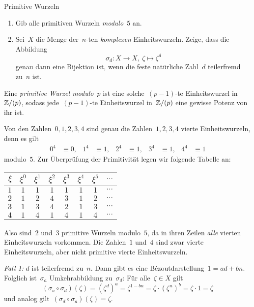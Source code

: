 \documentclass{algblatt}
\begin{document}
\ifloesungen\newpage\fi
\begin{aufgabe}{Primitive Wurzeln}
\begin{enumerate}
\item Gib alle primitiven Wurzeln \emph{modulo~$5$} an.

\item Sei~$X$ die Menge der~$n$-ten \emph{komplexen} Einheitswurzeln. Zeige, dass die
Abbildung
\[ \sigma_d : X \longrightarrow X,\ \zeta \longmapsto \zeta^d \]
genau dann eine Bijektion ist, wenn die feste natürliche Zahl~$d$ teilerfremd
zu~$n$ ist.
\end{enumerate}

\begin{loesungE}
\item Eine \emph{primitive Wurzel modulo~$p$} ist eine solche~$(p-1)$-te
Einheitswurzel in~$\mathbb{Z}/(p)$, sodass jede~$(p-1)$-te Einheitswurzel in~$\mathbb{Z}/(p)$
eine gewisse Potenz von ihr ist.

Von den Zahlen~$0,1,2,3,4$ sind genau die Zahlen~$1,2,3,4$ vierte
Einheitswurzeln, denn es gilt
\begin{align*}
  0^4 &\equiv 0, & 1^4 &\equiv 1, & 2^4 &\equiv 1, & 3^4 &\equiv 1, &
  4^4 &\equiv 1
\end{align*}
modulo~$5$. Zur Überprüfung der Primitivität legen wir folgende Tabelle an:
\begin{center}
  \begin{tabular}{r|c|c|c|c|c|c|c}
    $\xi$ & $\xi^0$ & $\xi^1$ & $\xi^2$ & $\xi^3$ & $\xi^4$ & $\xi^5$ & $\cdots$ \\\hline
    $1$ & $1$ & $1$ & $1$ & $1$ & $1$ & $1$ & $\cdots$ \\
    $2$ & $1$ & $2$ & $4$ & $3$ & $1$ & $2$ & $\cdots$ \\
    $3$ & $1$ & $3$ & $4$ & $2$ & $1$ & $3$ & $\cdots$ \\
    $4$ & $1$ & $4$ & $1$ & $4$ & $1$ & $4$ & $\cdots$
  \end{tabular}
\end{center}
Also sind~$2$ und~$3$ primitive Wurzeln modulo~$5$, da in ihren Zeilen
\emph{alle} vierten Einheitswurzeln vorkommen. Die Zahlen~$1$ und~$4$ sind zwar
vierte Einheitswurzeln, aber nicht primitive vierte Einheitswurzeln.

\item \emph{Fall 1:} $d$ ist teilerfremd zu~$n$. Dann gibt es eine
Bézoutdarstellung~$1 = ad + bn$. Folglich ist~$\sigma_a$ Umkehrabbildung
zu~$\sigma_d$: Für alle~$\zeta \in X$ gilt
\[ (\sigma_a \circ \sigma_d)(\zeta) =
  (\zeta^d)^a = \zeta^{1 - bn} = \zeta \cdot (\zeta^n)^b = \zeta \cdot 1 =
  \zeta \]
und analog gilt~$(\sigma_d \circ \sigma_a)(\zeta) = \zeta$.


\end{loesungE}
\end{aufgabe}
\end{document}
